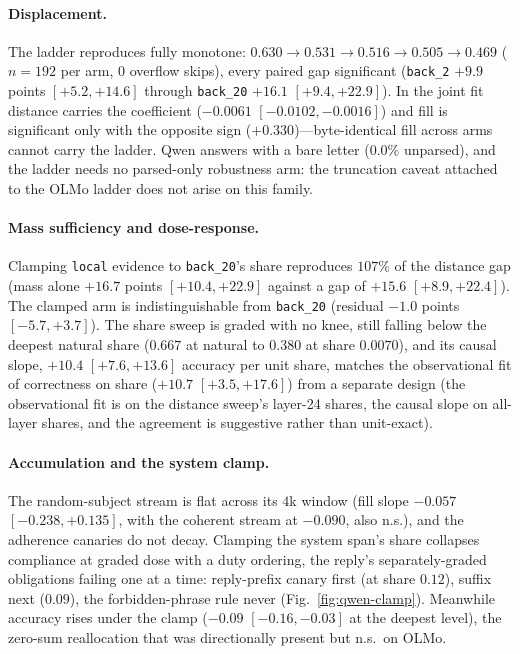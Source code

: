 \documentclass{article}
\begin{document}
\paragraph{Displacement.}
The ladder reproduces fully monotone: $0.630 \to 0.531 \to 0.516 \to 0.505 \to 0.469$
($n{=}192$ per arm, $0$ overflow skips), every paired gap significant
(\texttt{back\_2} $+9.9$ points $[+5.2,+14.6]$ through \texttt{back\_20} $+16.1$
$[+9.4,+22.9]$). In the joint fit distance carries the coefficient ($-0.0061$
$[-0.0102,-0.0016]$) and fill is significant only with the opposite sign
($+0.330$)---byte-identical fill across arms cannot carry the ladder. Qwen answers with a bare
letter ($0.0\%$ unparsed), and the ladder needs no parsed-only robustness arm: the truncation
caveat attached to the OLMo ladder does not arise on this family.

\paragraph{Mass sufficiency and dose-response.}
Clamping \texttt{local} evidence to \texttt{back\_20}'s share reproduces $107\%$ of the
distance gap (mass alone $+16.7$ points $[+10.4,+22.9]$ against a gap of $+15.6$
$[+8.9,+22.4]$). The clamped arm is indistinguishable from \texttt{back\_20} (residual
$-1.0$ points $[-5.7,+3.7]$). The share sweep is graded with no knee, still falling below the
deepest natural share ($0.667$ at natural to $0.380$ at share $0.0070$), and its causal slope,
$+10.4$ $[+7.6,+13.6]$ accuracy per unit share, matches the observational
fit of correctness on share ($+10.7$ $[+3.5,+17.6]$) from a separate design (the
observational fit is on the distance sweep's layer-24 shares, the causal slope on all-layer
shares, and the agreement is suggestive rather than unit-exact).

\paragraph{Accumulation and the system clamp.}
The random-subject stream is flat across its $4$k window (fill slope $-0.057$ $[-0.238,+0.135]$, with the coherent stream at $-0.090$, also n.s.), and the adherence canaries do not decay. Clamping the system
span's share collapses compliance at graded dose with a duty ordering, the reply's
separately-graded obligations failing one at a time: reply-prefix canary
first (at share $0.12$), suffix next ($0.09$), the forbidden-phrase rule never
(Fig.~\ref{fig:qwen-clamp}). Meanwhile accuracy rises under the clamp ($-0.09$
$[-0.16,-0.03]$ at the deepest level), the zero-sum reallocation that was directionally present
but n.s.\ on OLMo.
\end{document}

